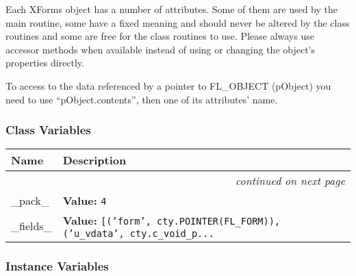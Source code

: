 Each XForms object has a number of attributes. Some of them are used by
the main routine, some have a fixed meaning and should never be altered
by the class routines and some are free for the class routines to use.
Please always use accessor methods when available instead of using or
changing the object's properties directly.

To access to the data referenced by a pointer to FL\_OBJECT (pObject) you
need to use ``pObject.contents'', then one of its attributes' name.


  \subsubsection{Class Variables}

    \vspace{-1cm}
\hspace{\varindent}\begin{longtable}{|p{\varnamewidth}|p{\vardescrwidth}|l}
\cline{1-2}
\cline{1-2} \centering \textbf{Name} & \centering \textbf{Description}& \\
\cline{1-2}
\endhead\cline{1-2}\multicolumn{3}{r}{\small\textit{continued on next page}}\\\endfoot\cline{1-2}
\endlastfoot\raggedright \_\-p\-a\-c\-k\-\_\- & \raggedright \textbf{Value:} 
{\tt 4}&\\
\cline{1-2}
\raggedright \_\-f\-i\-e\-l\-d\-s\-\_\- & \raggedright \textbf{Value:} 
{\tt [('form', cty.POINTER(FL\_FORM)), ('u\_vdata', cty.c\_void\_p\texttt{...}}&\\
\cline{1-2}
\end{longtable}



  \subsubsection{Instance Variables}

